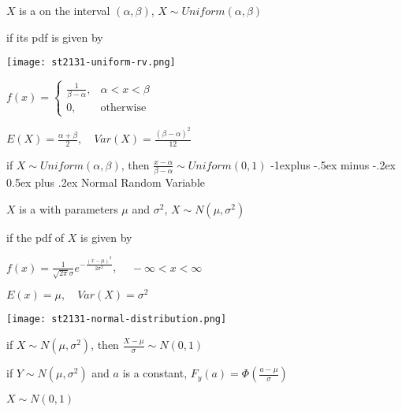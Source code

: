 \documentclass[10pt, landscape]{article}
\makeatletter
\renewcommand{\subsection}{\@startsection{subsection}{2}{0mm}%
  {-1explus -.5ex minus -.2ex}%
  {0.5ex plus .2ex}%
{\normalfont\normalsize\bfseries}}
\makeatother
\begin{document}
\begin{multicols*}{3}
  $X$ is a  on the interval $(\alpha, \beta)$, $X \sim Uniform(\alpha, \beta)$ 

  if its pdf is given by 

  \begin{minipage}[c]{0.25\linewidth}
    \texttt{[image: st2131-uniform-rv.png]} 
  \end{minipage}
  \begin{minipage}[c]{0.7\linewidth}
    \begin{tightcenter}
      $f(x) = \begin{cases} \frac{1}{\beta-\alpha}, &\alpha<x<\beta \\ 0, &\text{otherwise} \end{cases}$

      $E(X) = \frac{\alpha + \beta}{2}, \quad Var(X) = \frac{(\beta - \alpha)^2}{12}$
    \end{tightcenter}
  \end{minipage}

  if $X \sim Uniform(\alpha, \beta)$, then $\frac{x - \alpha}{\beta - \alpha} \sim Uniform (0,1)$
  \subsection{Normal Random Variable}

  $X$ is a  with parameters $\mu$ and $\sigma^2$, $X \sim N(\mu,\sigma^2)$ 

  if the pdf of $X$ is given by

  \begin{tightcenter}
    $f(x) = \frac{1}{\sqrt{2\pi} \sigma}e^{-\frac{(x-\mu)^2}{2 \sigma^2}}$, $\quad -\infty < x < \infty$

    $E(x) = \mu, \quad Var(X) = \sigma^2$
  \end{tightcenter}

  \begin{minipage}[c]{0.3\linewidth}
    \texttt{[image: st2131-normal-distribution.png]} 
  \end{minipage}
  \begin{minipage}[c]{0.67\linewidth}
    if $X \sim N(\mu, \sigma^2)$, then $\frac{X - \mu}{\sigma} \sim N(0, 1)$

    if $Y \sim N(\mu, \sigma^2)$ and $a$ is a constant, $F_y(a) = \Phi (\frac{a-\mu}{\sigma}) $
  \end{minipage}

   $X \sim N(0,1)$


\end{multicols*}
\end{document}
